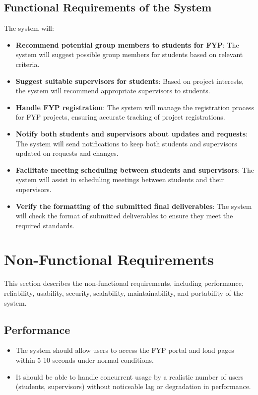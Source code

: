 \documentclass{FastFyp}
\begin{document}
\subsection{Functional Requirements of the System}
The system will:
\begin{itemize}
    \item \textbf{Recommend potential group members to students for FYP}: The system will suggest possible group members for students based on relevant criteria.
    \item \textbf{Suggest suitable supervisors for students}: Based on project interests, the system will recommend appropriate supervisors to students.
    \item \textbf{Handle FYP registration}: The system will manage the registration process for FYP projects, ensuring accurate tracking of project registrations.
    \item \textbf{Notify both students and supervisors about updates and requests}: The system will send notifications to keep both students and supervisors updated on requests and changes.
    \item \textbf{Facilitate meeting scheduling between students and supervisors}: The system will assist in scheduling meetings between students and their supervisors.
    \item \textbf{Verify the formatting of the submitted final deliverables}: The system will check the format of submitted deliverables to ensure they meet the required standards.
\end{itemize}

\section{Non-Functional Requirements}

This section describes the non-functional requirements, including performance, reliability, usability, security, scalability, maintainability, and portability of the system.

\subsection{Performance}
\begin{itemize}
    \item The system should allow users to access the FYP portal and load pages within 5-10 seconds under normal conditions.
    \item It should be able to handle concurrent usage by a realistic number of users (students, supervisors) without noticeable lag or degradation in performance.
\end{itemize}
\end{document}
